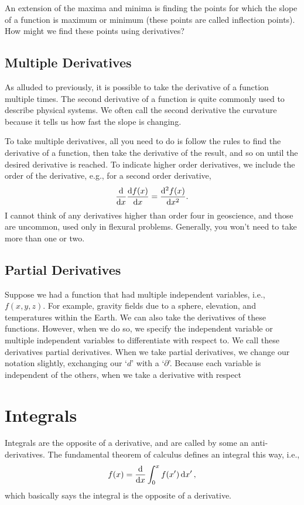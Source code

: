 \documentclass[final,a4paper,12pt]{article}
\theoremstyle{definition}
\begin{document}
An extension of the maxima and minima is finding the points for which the slope
of a function is maximum or minimum (these points are called inflection points).
How might we find these points using derivatives?

\subsection{Multiple Derivatives}
As alluded to previously, it is possible to take the derivative of a function
multiple times.  The second derivative of a function is quite commonly used to
describe physical systems.  We often call the second derivative the curvature
because it tells us how fast the slope is changing.

To take multiple derivatives, all you need to do is follow the rules to find the
derivative of a function, then take the derivative of the result, and so on
until the desired derivative is reached.  To indicate higher order derivatives,
we include the order of the derivative, e.g., for a second order derivative,
\begin{equation}
    \dv{}{x}\dv{f(x)}{x} = \dv[2]{f(x)}{x} .
\end{equation}
I cannot think of
any derivatives higher than order four in geoscience, and those are uncommon,
used only in flexural problems.  Generally, you won't need
to take more than one or two.

\subsection{Partial Derivatives}
Suppose we had a function that had multiple independent variables, i.e.,
$f(x,y,z)$.  For example, gravity fields due to a sphere, elevation, and
temperatures within the Earth.  We can also take the derivatives of these
functions.  However, when we do so, we specify the independent variable or
multiple independent variables to differentiate with respect to.  We call these
derivatives partial derivatives.  When we take partial derivatives, we change
our notation slightly, exchanging our `$d$' with a `$\partial$'.  Because each
variable is independent of the others, when we take a derivative with respect 



\section{Integrals}
Integrals are the opposite of a derivative, and are called by some an
anti-derivatives.  The fundamental theorem of calculus defines an integral this
way, i.e.,
\begin{equation*}
    f(x) = \dv{}{x} \int_0^x f(x') \dd{x'} ,
\end{equation*}
which basically says the integral is the opposite of a derivative.
\end{document}
